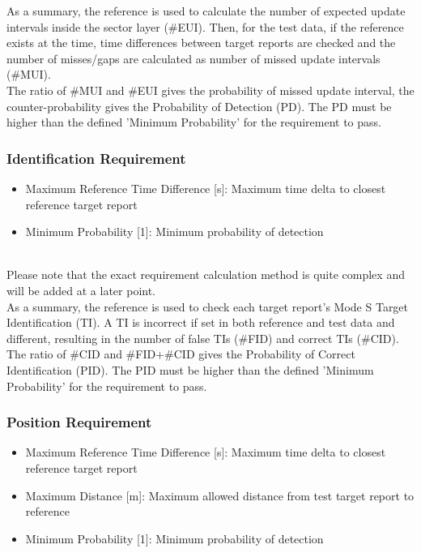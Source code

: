 As a summary, the reference is used to calculate the number of expected update intervals inside the sector layer (\#EUI). Then, for the test data, if the reference exists at the time, time differences between target reports are checked and the number of misses/gaps are calculated as number of missed update intervals (\#MUI). \\

The ratio of \#MUI and \#EUI gives the probability of missed update interval, the counter-probability gives the Probability of Detection (PD). The PD must be higher than the defined 'Minimum Probability' for the requirement to pass.

\subsubsection{Identification Requirement}

\begin{itemize}  
\item Maximum Reference Time Difference [s]: Maximum time delta to closest reference target report
\item Minimum Probability [1]: Minimum probability of detection
\end{itemize}
\ \\

Please note that the exact requirement calculation method is quite complex and will be added at a later point. \\

As a summary, the reference is used to check each target report's Mode S Target Identification (TI). A TI is incorrect if set in both reference and test data and different, resulting in the number of false TIs (\#FID) and correct TIs (\#CID). \\

The ratio of \#CID and \#FID+\#CID gives the Probability of Correct Identification (PID). The PID must be higher than the defined 'Minimum Probability' for the requirement to pass.

\subsubsection{Position Requirement}

\begin{itemize}  
\item Maximum Reference Time Difference [s]: Maximum time delta to closest reference target report
\item Maximum Distance [m]: Maximum allowed distance from test target report to reference
\item Minimum Probability [1]: Minimum probability of detection
\end{itemize}
\ \\

